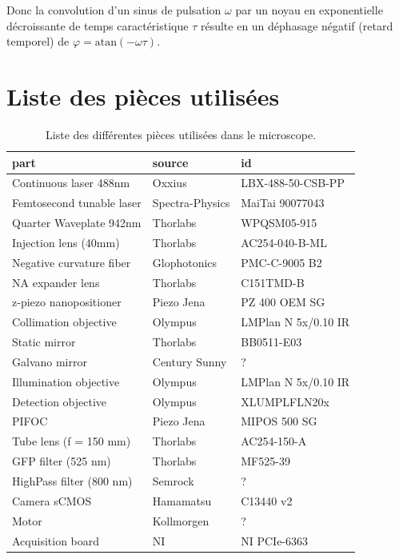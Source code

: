 Donc la convolution d'un sinus de pulsation $\omega$ par un noyau en exponentielle décroissante de temps caractéristique $\tau$ résulte en un déphasage négatif (retard temporel) de $ \varphi = \mathrm{atan}(-\omega\tau) $.


\chapter{Liste des pièces utilisées}\label{AppApartlist}

\begin{table}[h!]
    \centering
    \begin{tabular}{|l|l|l|}
        \hline
        \textbf{part} & \textbf{source} & \textbf{id}\\
        \hline
        Continuous laser 488nm & Oxxius & LBX-488-50-CSB-PP\\
        Femtosecond tunable laser & Spectra-Physics & MaiTai 90077043\\
        Quarter Waveplate 942nm & Thorlabs & WPQSM05-915\\
        Injection lens (40mm) & Thorlabs & AC254-040-B-ML\\
        Negative curvature fiber & Glophotonics & PMC-C-9005 B2\\
        NA expander lens & Thorlabs & C151TMD-B\\
        z-piezo nanopositioner & Piezo Jena & PZ 400 OEM SG\\
        Collimation objective & Olympus & LMPlan N 5x/0.10 IR\\
        Static mirror & Thorlabs & BB0511-E03\\
        Galvano mirror & Century Sunny & ?\\
        Illumination objective & Olympus & LMPlan N 5x/0.10 IR\\
        Detection objective & Olympus & XLUMPLFLN20x\\
        PIFOC & Piezo Jena & MIPOS 500 SG\\
        Tube lens (f = 150 mm) & Thorlabs & AC254-150-A\\
        GFP filter (525 nm) & Thorlabs & MF525-39\\
        HighPass filter (800 nm) & Semrock & ?\\
        Camera sCMOS & Hamamatsu & C13440 v2\\
        Motor & Kollmorgen & ?\\
        Acquisition board & NI & NI PCIe-6363\\
        \hline
    \end{tabular}
    \caption{Liste des différentes pièces utilisées dans le microscope.}
\end{table}